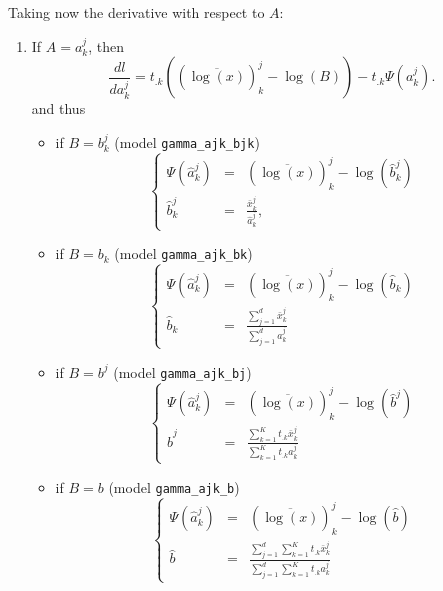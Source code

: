 \documentclass[a4paper,10pt]{article}
\begin{document}
Taking now the derivative with respect to $A$:
\begin{enumerate}
\item If $A = a^j_k$, then
$$
\frac{dl}{da^j_k} = t_{.k} \left( (\overline{\log(x)})^j_k -  \log(B)\right) - t_{.k}\Psi(a^j_k).
$$
and thus
\begin{itemize}
\item if $B=b^j_k$ (model \verb+gamma_ajk_bjk+)
\begin{equation}\label{eq:mStep_ajk_bjk}
\left\lbrace
\begin{array}{lcl}
  \Psi(\hat{a}^j_k) & = & (\overline{\log(x)})^j_k  - \log(\hat{b}^j_k) \\
  \hat{b}^j_k & = & \frac{\bar{x}^j_k}{\hat{a}^j_k},
\end{array}
\right.
\end{equation}
\item  if $B=b_k$  (model \verb+gamma_ajk_bk+)
\begin{equation}\label{eq:mStep_ajk_bk}
\left\lbrace
\begin{array}{lcl}
  \Psi(\hat{a}^j_k) & = & (\overline{\log(x)})^j_k  - \log(\hat{b}_k) \\
  \hat{b}_k         & = & \frac{\sum_{j=1}^d  \bar{x}^j_k}{\sum_{j=1}^d a^j_k}
\end{array}
\right.
\end{equation}
\item  if $B=b^j$  (model \verb+gamma_ajk_bj+)
\begin{equation}\label{eq:mStep_ajk_bj}
\left\lbrace
\begin{array}{lcl}
  \Psi(\hat{a}^j_k) & = & (\overline{\log(x)})^j_k  - \log(\hat{b}^j) \\
  \hat{b}^j         & = & \frac{\sum_{k=1}^K t_{.k} \bar{x}^j_k}{\sum_{k=1}^K t_{.k} a^j_k}
\end{array}
\right.
\end{equation}
\item if $B=b$  (model \verb+gamma_ajk_b+)
\begin{equation}\label{eq:mStep_ajk_b}
\left\lbrace
\begin{array}{lcl}
  \Psi(\hat{a}^j_k) & = & (\overline{\log(x)})^j_k  - \log(\hat{b}) \\
  \hat{b}           & = & \frac{\sum_{j=1}^d\sum_{k=1}^K t_{.k} \bar{x}^j_k}{\sum_{j=1}^d\sum_{k=1}^K t_{.k} a^j_k}
\end{array}
\right.
\end{equation}
\end{itemize}

\end{enumerate}
\end{document}
